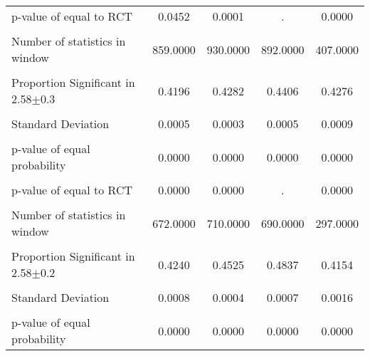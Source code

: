 {\begin{tabular}{l*{4}{c}}
p-value of equal to RCT&   0.0452         &   0.0001         &        .         &   0.0000         \\
                &                  &                  &                  &                  \\
Number of statistics in window& 859.0000         & 930.0000         & 892.0000         & 407.0000         \\
                &                  &                  &                  &                  \\
\hline Proportion Significant in 2.58$\pm$0.3&   0.4196         &   0.4282         &   0.4406         &   0.4276         \\
                &                  &                  &                  &                  \\
Standard Deviation&   0.0005         &   0.0003         &   0.0005         &   0.0009         \\
                &                  &                  &                  &                  \\
p-value of equal probability&   0.0000         &   0.0000         &   0.0000         &   0.0000         \\
                &                  &                  &                  &                  \\
p-value of equal to RCT&   0.0000         &   0.0000         &        .         &   0.0000         \\
                &                  &                  &                  &                  \\
Number of statistics in window& 672.0000         & 710.0000         & 690.0000         & 297.0000         \\
                &                  &                  &                  &                  \\
\hline Proportion Significant in 2.58$\pm$0.2&   0.4240         &   0.4525         &   0.4837         &   0.4154         \\
                &                  &                  &                  &                  \\
Standard Deviation&   0.0008         &   0.0004         &   0.0007         &   0.0016         \\
                &                  &                  &                  &                  \\
p-value of equal probability&   0.0000         &   0.0000         &   0.0000         &   0.0000         \\

\end{tabular}}
